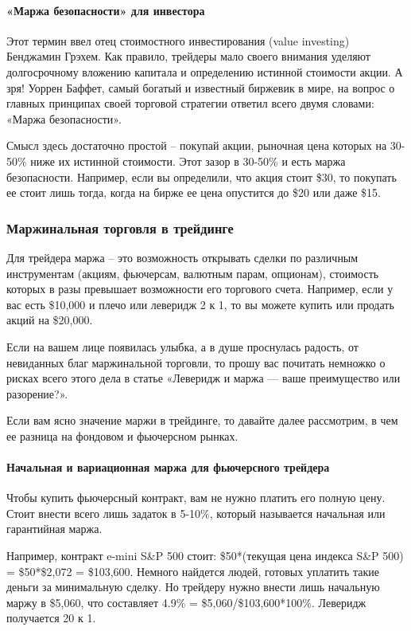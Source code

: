 \documentclass[a5paper]{article}
\begin{document}
\paragraph{«Маржа безопасности» для инвестора}

Этот термин ввел отец стоимостного инвестирования (value investing)
Бенджамин Грэхем. Как правило, трейдеры мало своего внимания уделяют
долгосрочному вложению капитала и определению истинной стоимости
акции. А зря! Уоррен Баффет, самый богатый и известный биржевик в
мире, на вопрос о главных принципах своей торговой стратегии ответил
всего двумя словами: «Маржа безопасности».

Смысл здесь достаточно простой – покупай акции, рыночная цена которых
на 30-50\% ниже их истинной стоимости. Этот зазор в 30-50\% и есть маржа
         безопасности. Например, если вы определили, что акция стоит
         \$30, то покупать ее стоит лишь тогда, когда на бирже ее цена
         опустится до \$20 или даже \$15.

\subsubsection{Маржинальная торговля в трейдинге}

Для трейдера маржа – это возможность открывать сделки по различным инструментам (акциям, фьючерсам, валютным парам, опционам), стоимость которых в разы превышает возможности его торгового счета. Например, если у вас есть \$10,000 и плечо или леверидж 2 к 1, то вы можете купить или продать акций на \$20,000.

Если на вашем лице появилась улыбка, а в душе проснулась радость, от невиданных благ маржинальной торговли, то прошу вас почитать немножко о рисках всего этого дела в статье «Леверидж и маржа — ваше преимущество или разорение?».

Если вам ясно значение маржи в трейдинге, то давайте далее рассмотрим,
в чем ее разница на фондовом и фьючерсном рынках.

\paragraph{Начальная и вариационная маржа для фьючерсного трейдера}

Чтобы купить фьючерсный контракт, вам не нужно платить его полную цену. Стоит внести всего лишь задаток в 5-10\%, который называется начальная или гарантийная маржа.

Например, контракт e-mini S\&P 500 стоит: \$50*(текущая цена индекса S\&P 500) = \$50*\$2,072 = \$103,600. Немного найдется людей, готовых уплатить такие деньги за минимальную сделку. Но трейдеру нужно внести лишь начальную маржу в \$5,060, что составляет 4.9\% = \$5,060/\$103,600*100\%. Леверидж получается 20 к 1.
\end{document}
